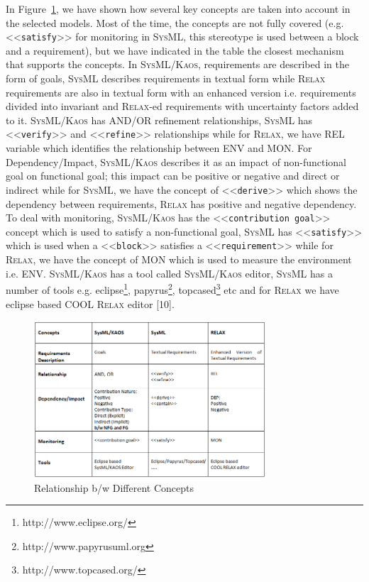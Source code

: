 \documentclass[10pt, conference, compsocconf]{IEEEtran}
\def\myrelax{\textsc{Relax}}                  %
\def\sysml{\textsc{SysML}}
\def\kaos{\textsc{Kaos}}
\newcommand{\Myfig}[1]{Figure~\ref{fig:#1}}
\newcommand{\stereotype}[1]{\textless\textless\texttt{#1}\textgreater\textgreater}
\begin{document}
In \Myfig{Relationship}, we have shown how several key concepts are taken into account in the selected models. Most of the time, the concepts are not fully covered (e.g. \stereotype{satisfy} for monitoring in \sysml{}, this stereotype is used between a block and a requirement), but we have indicated in the table the closest mechanism that supports the concepts. In \sysml{}/\kaos{}, requirements are described in the form of goals, \sysml{} describes requirements in textual form while \myrelax{} requirements are also in textual form with an enhanced version i.e. requirements divided into invariant and \myrelax{}-ed requirements with uncertainty factors added to it. \sysml{}/\kaos{} has AND/OR refinement relationships, \sysml{} has \stereotype{verify} and \stereotype{refine} relationships while for \myrelax{}, we have REL variable which identifies the relationship between ENV and MON. For Dependency/Impact, \sysml{}/\kaos{} describes it as an impact of non-functional goal on functional goal; this impact can be positive or negative and direct or indirect while for \sysml{}, we have the concept of \stereotype{derive} which shows the dependency between requirements, \myrelax{} has positive and negative dependency. To deal with monitoring, \sysml{}/\kaos{} has the \stereotype{contribution goal} concept which is used to satisfy a non-functional goal, \sysml{} has \stereotype{satisfy} which is  used when a \stereotype{block} satisfies a \stereotype{requirement} while for \myrelax{}, we have the concept of MON which is used to measure the environment i.e. ENV. \sysml{}/\kaos{} has a tool called \sysml{}/\kaos{} editor, \sysml{} has a number of tools e.g. eclipse\footnote{http://www.eclipse.org/}, papyrus\footnote{http://www.papyrusuml.org}, topcased\footnote{http://www.topcased.org/} etc and for \myrelax{} we have eclipse based COOL \myrelax{} editor [10]. 

\begin{figure}[!t]
\centering
\includegraphics[width=3.4in]{fig13}
\caption{Relationship b/w Different Concepts}
\label{fig:Relationship}
\end{figure}
\end{document}
